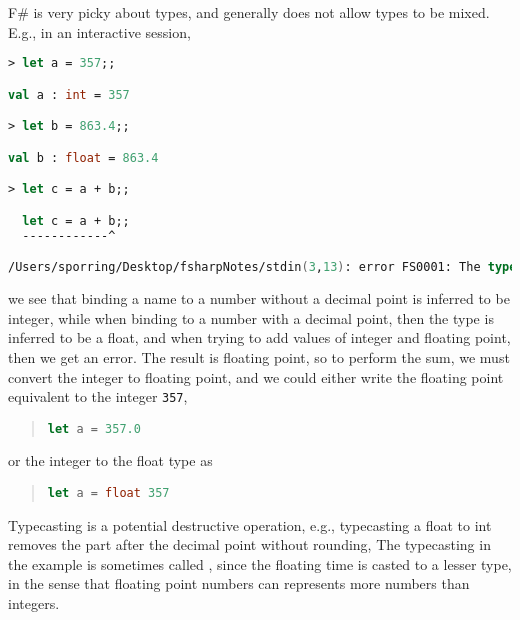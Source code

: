 F\# is very picky about types, and generally does not allow types to be mixed. E.g., in an interactive session,
\begin{lstlisting}[language=fsharp,caption=fsharpi]
> let a = 357;;

val a : int = 357

> let b = 863.4;;

val b : float = 863.4

> let c = a + b;;

  let c = a + b;;
  ------------^

/Users/sporring/Desktop/fsharpNotes/stdin(3,13): error FS0001: The type 'float' does not match the type 'int'
\end{lstlisting}
we see that binding a name to a number without a decimal point is inferred to be integer, while when binding to a number with a decimal point, then the type is inferred to be a float, and when trying to add values of integer and floating point, then we get an error. The result is floating point, so to perform the sum, we must convert the integer to floating point, and we could either write the floating point equivalent to the integer \lstinline|357|,
\begin{quote}
  \lstinline[language=fsharp]|let a = 357.0|
\end{quote}
or  the integer to the float type as
\begin{quote}
  \lstinline[language=fsharp]|let a = float 357|
\end{quote}
Typecasting is a potential destructive operation, e.g., typecasting a float to int removes the part after the decimal point without rounding,
The typecasting in the example is sometimes called , since the floating time is casted to a lesser type, in the sense that floating point numbers can represents more numbers than integers.


